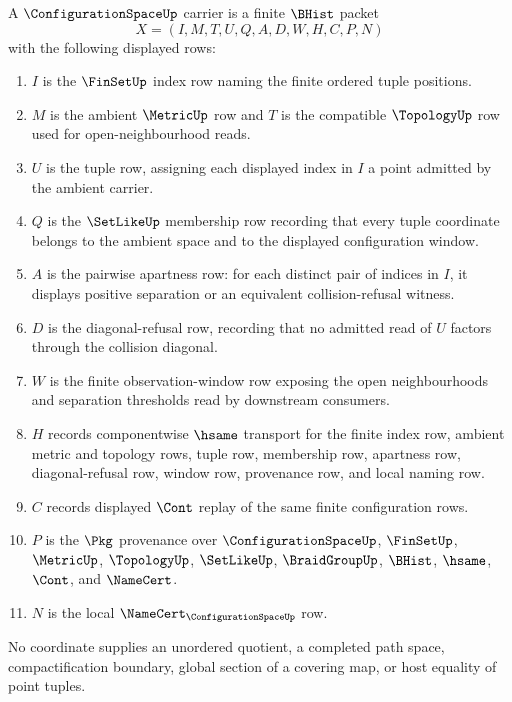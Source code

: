 \begin{definition}
\label{def:configuration-space-carrier}
A $\ConfigurationSpaceUp$ carrier is a finite $\BHist$ packet
$$
X=(I,M,T,U,Q,A,D,W,H,C,P,N)
$$
with the following displayed rows:
\begin{enumerate}
\item $I$ is the $\FinSetUp$ index row naming the finite ordered tuple positions.
\item $M$ is the ambient $\MetricUp$ row and $T$ is the compatible $\TopologyUp$ row used for open-neighbourhood reads.
\item $U$ is the tuple row, assigning each displayed index in $I$ a point admitted by the ambient carrier.
\item $Q$ is the $\SetLikeUp$ membership row recording that every tuple coordinate belongs to the ambient space and to the displayed configuration window.
\item $A$ is the pairwise apartness row: for each distinct pair of indices in $I$, it displays positive separation or an equivalent collision-refusal witness.
\item $D$ is the diagonal-refusal row, recording that no admitted read of $U$ factors through the collision diagonal.
\item $W$ is the finite observation-window row exposing the open neighbourhoods and separation thresholds read by downstream consumers.
\item $H$ records componentwise $\hsame$ transport for the finite index row, ambient metric and topology rows, tuple row, membership row, apartness row, diagonal-refusal row, window row, provenance row, and local naming row.
\item $C$ records displayed $\Cont$ replay of the same finite configuration rows.
\item $P$ is the $\Pkg$ provenance over $\ConfigurationSpaceUp$, $\FinSetUp$, $\MetricUp$, $\TopologyUp$, $\SetLikeUp$, $\BraidGroupUp$, $\BHist$, $\hsame$, $\Cont$, and $\NameCert$.
\item $N$ is the local $\NameCert_{\ConfigurationSpaceUp}$ row.
\end{enumerate}
No coordinate supplies an unordered quotient, a completed path space, compactification boundary, global section of a covering map, or host equality of point tuples.
\end{definition}

